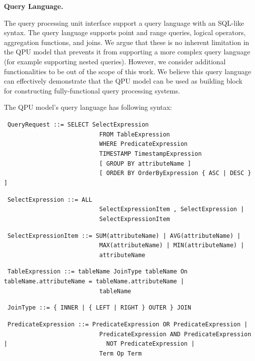 \bigskip

\textbf{Query Language.}

The query processing unit interface support a query language with an SQL-like syntax.
The query language supports point and range queries, logical operators, aggregation functions, and joins.
We argue that these is no inherent limitation in the QPU model that prevents it from supporting a more complex
query language (for example supporting nested queries).
However, we consider additional functionalities to be out of the scope of this work.
We believe this query language can effectively demonstrate that the QPU model can be used as building
block for constructing fully-functional query processing systems.

\medskip
\noindent
The QPU model's query language has following syntax:

{\obeylines\obeyspaces
\texttt{
QueryRequest          ::=  SELECT SelectExpression
~~~~~~~~~~~~~~~~~~~~~~~~~~~FROM TableExpression
~~~~~~~~~~~~~~~~~~~~~~~~~~~WHERE PredicateExpression
~~~~~~~~~~~~~~~~~~~~~~~~~~~TIMESTAMP TimestampExpression 
~~~~~~~~~~~~~~~~~~~~~~~~~~~[ GROUP BY attributeName ]
~~~~~~~~~~~~~~~~~~~~~~~~~~~[ ORDER BY OrderByExpression \{ ASC | DESC \} ]
}}

{\obeylines\obeyspaces
\texttt{
SelectExpression      ::=  ALL
~~~~~~~~~~~~~~~~~~~~~~~~~~~SelectExpressionItem , SelectExpression |
~~~~~~~~~~~~~~~~~~~~~~~~~~~SelectExpressionItem
}}

{\obeylines\obeyspaces
\texttt{
SelectExpressionItem  ::=  SUM(attributeName) | AVG(attributeName) |
~~~~~~~~~~~~~~~~~~~~~~~~~~~MAX(attributeName) | MIN(attributeName) |
~~~~~~~~~~~~~~~~~~~~~~~~~~~attributeName
}}

{\obeylines\obeyspaces
\texttt{
TableExpression       ::=  tableName JoinType tableName On tableName.attributeName = tableName.attributeName |
~~~~~~~~~~~~~~~~~~~~~~~~~~~tableName
}}

{\obeylines\obeyspaces
\texttt{
JoinType              ::=  \{ INNER | \{ LEFT | RIGHT \} OUTER \} JOIN
}}

{\obeylines\obeyspaces
\texttt{
PredicateExpression   ::=  PredicateExpression OR PredicateExpression |
~~~~~~~~~~~~~~~~~~~~~~~~~~~PredicateExpression AND PredicateExpression |
~~~~~~~~~~~~~~~~~~~~~~~~~~~NOT PredicateExpression |
~~~~~~~~~~~~~~~~~~~~~~~~~~~Term Op Term
}}

